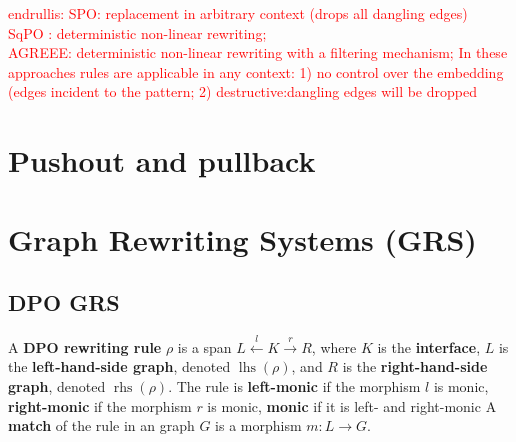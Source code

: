 \textcolor{red}{endrullis: 
SPO: replacement in arbitrary context (drops all dangling edges)\\
SqPO : deterministic non-linear rewriting;\\
AGREEE: deterministic non-linear rewriting with a filtering mechanism;
In these approaches rules are applicable in any context: 1) no control over the embedding (edges incident to the pattern; 2) destructive:dangling edges will be dropped
}

\section{Pushout and pullback}
    \label{sec:category_theory}
    

\section{Graph Rewriting Systems (GRS)} 

\subsection{DPO GRS}
\begin{definition}
    \label{def:grs:dpo_rule}
  A \textbf{DPO rewriting rule} $\rho$ is a span \( L \overset{l}{\leftarrow} K \overset{r}{\rightarrow} R \), where \( K \) is the \textbf{interface}, \( L \) is the \textbf{left-hand-side graph}, denoted \( \operatorname{lhs}(\rho) \), and \( R \) is the \textbf{right-hand-side graph}, denoted \( \operatorname{rhs}(\rho) \). The rule is \textbf{left-monic} if the morphism \( l \) is monic, \textbf{right-monic} if the morphism \( r \) is monic, \textbf{monic} if it is left- and right-monic   
  A \textbf{match} of the rule in an graph \( G \) is a morphism \( m: L \rightarrow G \).   
  \end{definition}

